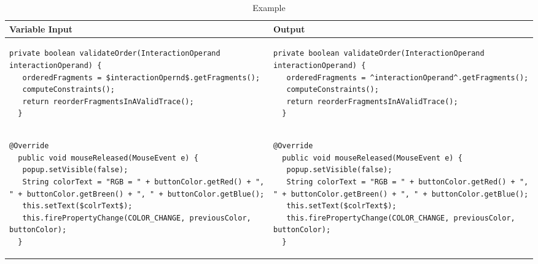 \begin{landscape}
\begin{table}[p]
\begin{tabular}{ | m{10cm} | m{10cm} | }
  \hline
  Variable Input & Output \\
  \hline
  {\begin{lstlisting}[style=table]
  private boolean validateOrder(InteractionOperand interactionOperand) {
   orderedFragments = $interactionOpernd$.getFragments();
   computeConstraints();
   return reorderFragmentsInAValidTrace();
  }
  \end{lstlisting}} &
  {\begin{lstlisting}[style=table]
  private boolean validateOrder(InteractionOperand interactionOperand) {
   orderedFragments = ^interactionOperand^.getFragments();
   computeConstraints();
   return reorderFragmentsInAValidTrace();
  }
  \end{lstlisting}} \\
  \hline
  {\begin{lstlisting}[style=table]
  @Override
  public void mouseReleased(MouseEvent e) {
   popup.setVisible(false);
   String colorText = "RGB = " + buttonColor.getRed() + ", " + buttonColor.getBreen() + ", " + buttonColor.getBlue();
   this.setText($colrText$);
   this.firePropertyChange(COLOR_CHANGE, previousColor, buttonColor);
  }
  \end{lstlisting}} &
  {\begin{lstlisting}[style=table]
  @Override
  public void mouseReleased(MouseEvent e) {
   popup.setVisible(false);
   String colorText = "RGB = " + buttonColor.getRed() + ", " + buttonColor.getBreen() + ", " + buttonColor.getBlue();
   this.setText($colrText$);
   this.firePropertyChange(COLOR_CHANGE, previousColor, buttonColor);
  }
  \end{lstlisting}} \\
  \hline
\end{tabular}
\caption{Example}
\label{variable_showcase_table}
\end{table}


\end{landscape}
